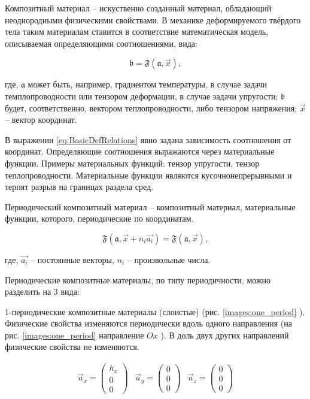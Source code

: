 Композитный материал -- искуственно созданный материал, обладающий неоднородными физическими свойствами.
В механике деформируемого твёрдого тела таким материалам ставится в соответствие математическая модель, описываемая определяющими соотношениями, вида:

\begin{equation}
    \label{eq:BasicDefRelations}
    \mathfrak{b} = \mathfrak{F}(\mathfrak{a}, \vec{x}),
\end{equation}

где, 
$\mathfrak{a}$ 
может быть, например, градиентом температуры, в случае задачи темплопроводности или тензором деформации, в случае задачи упругости; 
$\mathfrak{b}$ 
будет, соответственно, вектором теплопроводности, либо тензором напряжения; 
$\vec{x}$ 
-- вектор координат.

В выражении 
\ref{eq:BasicDefRelations} 
явно задана зависимость соотношения от координат. 
Определяющие соотношения выражаются через материальные функции.
Примеры материальных функций: тензор упругости, тензор теплопроводности.
Материальные функции являются кусочнонепрерывными и терпят разрыв на границах раздела сред.


Периодический композитный материал -- композитный материал, материальные функции, которого, периодические по координатам.

\begin{equation}
    \label{eq:BasicPeriodicFuction}
    \mathfrak{F}(\mathfrak{a}, \vec{x} + n_i\vec{a_i}) = \mathfrak{F}(\mathfrak{a}, \vec{x}),
\end{equation}

где, 
$\vec{a_i}$ 
-- постоянные векторы, 
$n_i$ 
-- произвольные числа.

Периодические композитные материалы, по типу периодичности, можно разделить на 3 вида:

1-периодические композитные материалы (слоистые) (рис. 
\ref{images:one_period}
).
Физические свойства изменяются периодически вдоль одного направления (на рис. 
\ref{images:one_period}
направление 
$Ox$
). В доль двух других направлений физические свойства не изменяются.

\begin{equation}
    \begin{array}{ccc}
    \vec{a}_x = \left(\begin{array}{c}h_x\\0\\0\end{array}\right) & 
    \vec{a}_y = \left(\begin{array}{c}0\\0\\0\end{array}\right) & 
    \vec{a}_z = \left(\begin{array}{c}0\\0\\0\end{array}\right)
    \end{array}
\end{equation}

